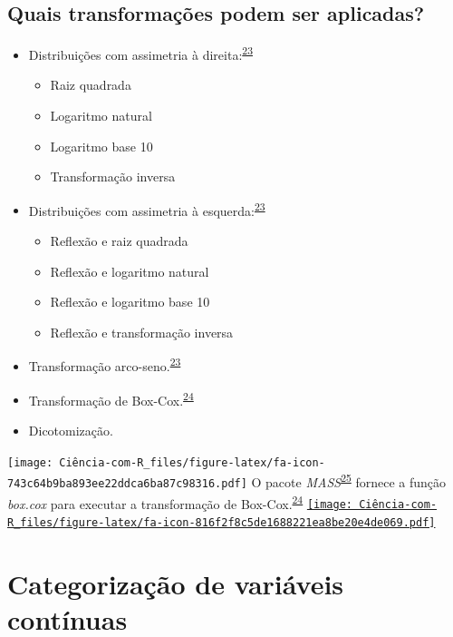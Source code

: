 \documentclass[
]{book}
\begin{document}
\hypertarget{quais-transformauxe7uxf5es-podem-ser-aplicadas}{%
\subsection{Quais transformações podem ser aplicadas?}\label{quais-transformauxe7uxf5es-podem-ser-aplicadas}}

\begin{itemize}
\item
  Distribuições com assimetria à direita:\textsuperscript{\protect\hyperlink{ref-osborne2010}{23}}

  \begin{itemize}
  \item
    Raiz quadrada
  \item
    Logaritmo natural
  \item
    Logaritmo base 10
  \item
    Transformação inversa
  \end{itemize}
\item
  Distribuições com assimetria à esquerda:\textsuperscript{\protect\hyperlink{ref-osborne2010}{23}}

  \begin{itemize}
  \item
    Reflexão e raiz quadrada
  \item
    Reflexão e logaritmo natural
  \item
    Reflexão e logaritmo base 10
  \item
    Reflexão e transformação inversa
  \end{itemize}
\item
  Transformação arco-seno.\textsuperscript{\protect\hyperlink{ref-osborne2010}{23}}
\item
  Transformação de Box-Cox.\textsuperscript{\protect\hyperlink{ref-box1964}{24}}
\item
  Dicotomização.
\end{itemize}

\texttt{[image: Ciência-com-R\_files/figure-latex/fa-icon-743c64b9ba893ee22ddca6ba87c98316.pdf]} O pacote \emph{MASS}\textsuperscript{\protect\hyperlink{ref-MASS}{25}} fornece a função \emph{box.cox} para executar a transformação de Box-Cox.\textsuperscript{\protect\hyperlink{ref-box1964}{24}} \href{https://cran.r-project.org/web/packages/MASS/index.html}{\texttt{[image: Ciência-com-R\_files/figure-latex/fa-icon-816f2f8c5de1688221ea8be20e4de069.pdf]}}

\hypertarget{categorizacao}{%
\section{Categorização de variáveis contínuas}\label{categorizacao}}
\end{document}
